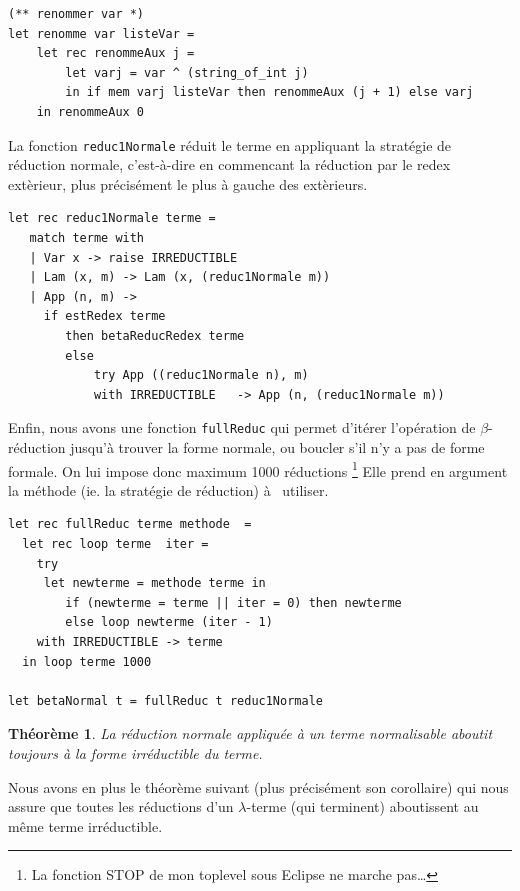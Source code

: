 \documentclass[11pt]{book}
\newtheorem{theoreme}{Théorème}
\begin{document}
\begin{Verbatim}
(** renommer var *)
let renomme var listeVar =
	let rec renommeAux j =
		let varj = var ^ (string_of_int j)
		in if mem varj listeVar then renommeAux (j + 1) else varj
	in renommeAux 0
\end{Verbatim}

La fonction \texttt{reduc1Normale}  r\'{e}duit le terme en appliquant la strat\'{e}gie de r\'{e}duction normale, c'est-\`{a}-dire
en commencant la r\'{e}duction par le redex ext\`{e}rieur, plus pr\'{e}cis\'{e}ment le plus \`{a} gauche des ext\`{e}rieurs.



\begin{Verbatim}
let rec reduc1Normale terme =
   match terme with
   | Var x -> raise IRREDUCTIBLE 
   | Lam (x, m) -> Lam (x, (reduc1Normale m))
   | App (n, m) ->
	 if estRedex terme
		then betaReducRedex terme
		else
			try App ((reduc1Normale n), m)
			with IRREDUCTIBLE   -> App (n, (reduc1Normale m)) 
\end{Verbatim}

Enfin, nous avons une fonction \verb+fullReduc+ qui permet d'itérer l'opération de
$\beta$-réduction jusqu'à trouver la forme normale, ou boucler s'il n'y a pas de forme formale.
On lui impose donc maximum 1000 réductions \footnote{La fonction STOP de mon toplevel sous Eclipse ne marche pas\ldots}
Elle prend en argument la méthode (ie. la stratégie de réduction) à  utiliser. 

\begin{Verbatim}
let rec fullReduc terme methode  =
  let rec loop terme  iter =
	try
	 let newterme = methode terme in
		if (newterme = terme || iter = 0) then newterme
		else loop newterme (iter - 1)
	with IRREDUCTIBLE -> terme	
  in loop terme 1000
	
let betaNormal t = fullReduc t reduc1Normale
\end{Verbatim}

\begin{theoreme}
La réduction normale appliquée à un terme normalisable aboutit toujours à la forme irréductible du terme.
\end{theoreme}

Nous avons en plus le théorème suivant (plus précisément son corollaire) qui nous assure que toutes les réductions d'un $\lambda$-terme (qui terminent) aboutissent au m\^{e}me
terme irréductible.
\end{document}
